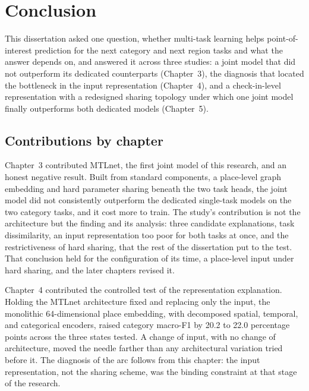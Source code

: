 
\chapter{Conclusion}
\label{ch:conclusion}

This dissertation asked one question, whether multi-task learning helps
point-of-interest prediction for the next category and next region tasks and what the
answer depends on, and answered it across three studies: a joint model that did not
outperform its dedicated counterparts (Chapter~3), the diagnosis that located the
bottleneck in the input representation (Chapter~4), and a check-in-level
representation with a redesigned sharing topology under which one joint model finally
outperforms both dedicated models (Chapter~5).

\section{Contributions by chapter}
\label{sec:conc:contributions}

Chapter~3 contributed MTLnet, the first joint model of this research, and an honest
negative result. Built from standard components, a place-level graph embedding and
hard parameter sharing beneath the two task heads, the joint model did not
consistently outperform the dedicated single-task models on the two category tasks,
and it cost more to train. The study's contribution is not the architecture but the
finding and its analysis: three candidate explanations, task dissimilarity, an input
representation too poor for both tasks at once, and the restrictiveness of hard
sharing, that the rest of the dissertation put to the test. That conclusion held for
the configuration of its time, a place-level input under hard sharing, and the later
chapters revised it.

Chapter~4 contributed the controlled test of the representation explanation. Holding
the MTLnet architecture fixed and replacing only the input, the monolithic
64-dimensional place embedding, with decomposed spatial, temporal, and categorical
encoders, raised category macro-F1 by 20.2 to 22.0 percentage points across the three
states tested. A change of input, with no change of architecture, moved the needle
farther than any architectural variation tried before it. The diagnosis of the arc
follows from this chapter: the input representation, not the sharing scheme, was the
binding constraint at that stage of the research.

